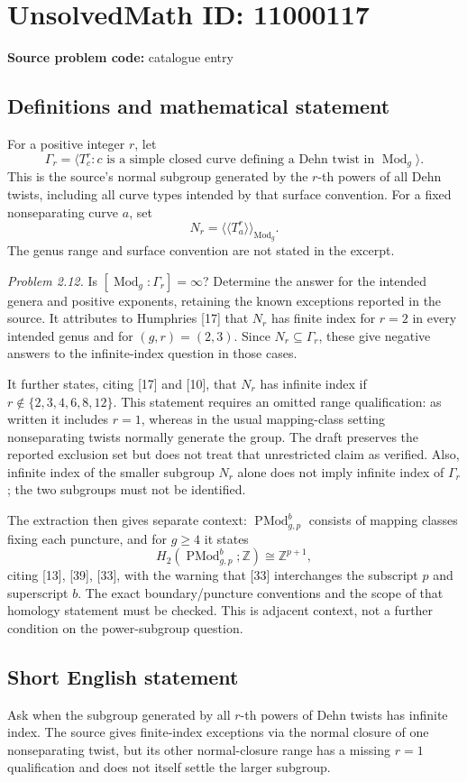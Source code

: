 \documentclass[11pt]{article}
\newcommand{\Z}{\mathbb{Z}}
\begin{document}
\section*{UnsolvedMath ID: 11000117}
\textbf{Source problem code:} catalogue entry
\subsection{Definitions and mathematical statement}
For a positive integer \(r\), let
\[
 \Gamma_r=\langle T_c^r:c\text{ is a simple closed curve defining a Dehn twist in }\operatorname{Mod}_g\rangle.
\]
This is the source's normal subgroup generated by the \(r\)-th powers of all Dehn twists, including all curve types intended by that surface convention. For a fixed nonseparating curve \(a\), set
\[
 N_r=\langle\!\langle T_a^r\rangle\!\rangle_{\operatorname{Mod}_g}.
\]
The genus range and surface convention are not stated in the excerpt.

\emph{Problem 2.12.} Is \([\operatorname{Mod}_g:\Gamma_r]=\infty\)? Determine the answer for the intended genera and positive exponents, retaining the known exceptions reported in the source. It attributes to Humphries [17] that \(N_r\) has finite index for \(r=2\) in every intended genus and for \((g,r)=(2,3)\). Since \(N_r\subseteq\Gamma_r\), these give negative answers to the infinite-index question in those cases.

It further states, citing [17] and [10], that \(N_r\) has infinite index if \(r\notin\{2,3,4,6,8,12\}\). This statement requires an omitted range qualification: as written it includes \(r=1\), whereas in the usual mapping-class setting nonseparating twists normally generate the group. The draft preserves the reported exclusion set but does not treat that unrestricted claim as verified. Also, infinite index of the smaller subgroup \(N_r\) alone does not imply infinite index of \(\Gamma_r\); the two subgroups must not be identified.

The extraction then gives separate context: \(\operatorname{PMod}_{g,p}^{b}\) consists of mapping classes fixing each puncture, and for \(g\geq4\) it states
\[
 H_2(\operatorname{PMod}_{g,p}^{b};\Z)\cong\Z^{p+1},
\]
citing [13], [39], [33], with the warning that [33] interchanges the subscript \(p\) and superscript \(b\). The exact boundary/puncture conventions and the scope of that homology statement must be checked. This is adjacent context, not a further condition on the power-subgroup question.
\subsection{Short English statement}
Ask when the subgroup generated by all \(r\)-th powers of Dehn twists has infinite index. The source gives finite-index exceptions via the normal closure of one nonseparating twist, but its other normal-closure range has a missing \(r=1\) qualification and does not itself settle the larger subgroup.
\end{document}
